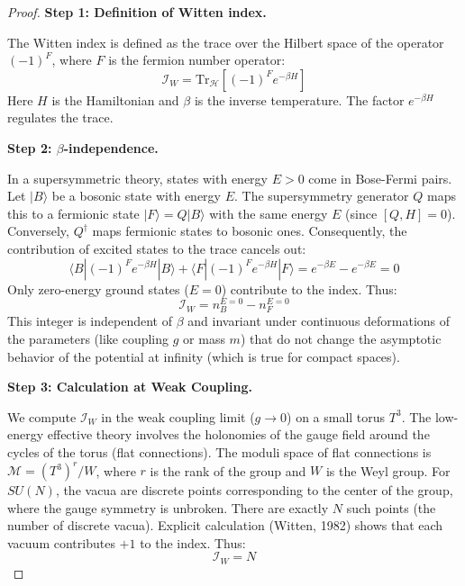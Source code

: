 \begin{proof}
\textbf{Step 1: Definition of Witten index.}

The Witten index is defined as the trace over the Hilbert space of the operator $(-1)^F$, where $F$ is the fermion number operator:
\begin{equation}
\mathcal{I}_W = \mathrm{Tr}_{\mathcal{H}} [(-1)^F e^{-\beta H}]
\end{equation}
Here $H$ is the Hamiltonian and $\beta$ is the inverse temperature. The factor $e^{-\beta H}$ regulates the trace.

\textbf{Step 2: $\beta$-independence.}

In a supersymmetric theory, states with energy $E > 0$ come in Bose-Fermi pairs. Let $|B\rangle$ be a bosonic state with energy $E$. The supersymmetry generator $Q$ maps this to a fermionic state $|F\rangle = Q |B\rangle$ with the same energy $E$ (since $[Q, H] = 0$). Conversely, $Q^\dagger$ maps fermionic states to bosonic ones.
Consequently, the contribution of excited states to the trace cancels out:
\begin{equation}
\langle B | (-1)^F e^{-\beta H} | B \rangle + \langle F | (-1)^F e^{-\beta H} | F \rangle = e^{-\beta E} - e^{-\beta E} = 0
\end{equation}
Only zero-energy ground states ($E=0$) contribute to the index. Thus:
\begin{equation}
\mathcal{I}_W = n_B^{E=0} - n_F^{E=0}
\end{equation}
This integer is independent of $\beta$ and invariant under continuous deformations of the parameters (like coupling $g$ or mass $m$) that do not change the asymptotic behavior of the potential at infinity (which is true for compact spaces).

\textbf{Step 3: Calculation at Weak Coupling.}

We compute $\mathcal{I}_W$ in the weak coupling limit ($g \to 0$) on a small torus $T^3$. The low-energy effective theory involves the holonomies of the gauge field around the cycles of the torus (flat connections).
The moduli space of flat connections is $\mathcal{M} = (T^3)^r / W$, where $r$ is the rank of the group and $W$ is the Weyl group.
For $SU(N)$, the vacua are discrete points corresponding to the center of the group, where the gauge symmetry is unbroken.
There are exactly $N$ such points (the number of discrete vacua).
Explicit calculation (Witten, 1982) shows that each vacuum contributes $+1$ to the index.
Thus:
\begin{equation}
\mathcal{I}_W = N
\end{equation}


\end{proof}
